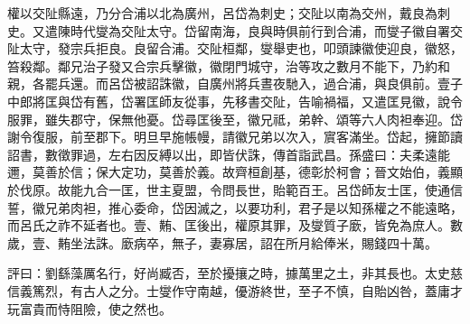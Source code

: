 \begin{pinyinscope}
權以交阯縣遠，乃分合浦以北為廣州，呂岱為刺史；交阯以南為交州，戴良為刺史。又遣陳時代燮為交阯太守。岱留南海，良與時俱前行到合浦，而燮子徽自署交阯太守，發宗兵拒良。良留合浦。交阯桓鄰，燮舉吏也，叩頭諫徽使迎良，徽怒，笞殺鄰。鄰兄治子發又合宗兵擊徽，徽閉門城守，治等攻之數月不能下，乃約和親，各罷兵還。而呂岱被詔誅徽，自廣州將兵晝夜馳入，過合浦，與良俱前。壹子中郎將匡與岱有舊，岱署匡師友從事，先移書交阯，告喻禍福，又遣匡見徽，說令服罪，雖失郡守，保無他憂。岱尋匡後至，徽兄祗，弟幹、頌等六人肉袒奉迎。岱謝令復服，前至郡下。明旦早施帳幔，請徽兄弟以次入，賔客滿坐。岱起，擁節讀詔書，數徵罪過，左右因反縛以出，即皆伏誅，傳首詣武昌。孫盛曰：夫柔遠能邇，莫善於信；保大定功，莫善於義。故齊桓創基，德彰於柯會；晉文始伯，義顯於伐原。故能九合一匡，世主夏盟，令問長世，貽範百王。呂岱師友士匡，使通信誓，徽兄弟肉袒，推心委命，岱因滅之，以要功利，君子是以知孫權之不能遠略，而呂氏之祚不延者也。壹、䵋、匡後出，權原其罪，及燮質子廞，皆免為庶人。數歲，壹、䵋坐法誅。廞病卒，無子，妻寡居，詔在所月給俸米，賜錢四十萬。

評曰：劉繇藻厲名行，好尚臧否，至於擾攘之時，據萬里之土，非其長也。太史慈信義篤烈，有古人之分。士燮作守南越，優游終世，至子不慎，自貽凶咎，蓋庸才玩富貴而恃阻險，使之然也。


\end{pinyinscope}